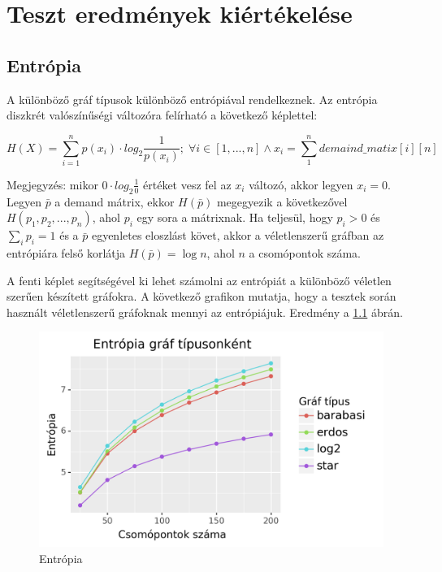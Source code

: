 \documentclass[12pt]{report}
\begin{document}
\chapter{Teszt eredmények kiértékelése}

\section{Entrópia}

A különböző gráf típusok különböző entrópiával rendelkeznek.
Az entrópia diszkrét valószínűségi változóra felírható a következő képlettel\cite{DBLP:journals/corr/AvinMS17}:  

\[H(X) = \sum_{i=1}^{n} p(x_i) \cdot log_2\frac{1}{p(x_i)}; \; \forall i\in[1, ..., n] \land x_i = \sum_{1}^{n} demaind\_matix[i][n]\] 

Megjegyzés: mikor \(0\cdot log_2\frac{1}{0}\) értéket vesz fel az \(x_i\) változó, akkor legyen \(x_i=0\). 
Legyen \(\bar{p}\) a demand mátrix, ekkor \(H(\bar{p})\) megegyezik a következővel \(H(p_1, p_2, ..., p_n)\), ahol \(p_i\) egy sora a mátrixnak.
Ha teljesül, hogy \(p_i > 0\) és $\sum_{i}p_i = 1$ és a \(\bar{p}\) egyenletes eloszlást követ, akkor a véletlenszerű gráfban az entrópiára felső korlátja \(H(\bar{p}) = \log n\), ahol $n$ a csomópontok száma.

A fenti képlet segítségével ki lehet számolni az entrópiát a különböző véletlen szerűen készített gráfokra.
A következő grafikon mutatja, hogy a tesztek során használt véletlenszerű gráfoknak mennyi az entrópiájuk.
Eredmény a \ref{entropy} ábrán.

\begin{figure}[H]
	\begin{center}
		\includegraphics[width=0.9\linewidth]{pictures/entropy.png}
		\caption{Entrópia}
		\label{entropy}
	\end{center}
\end{figure}
\end{document}

